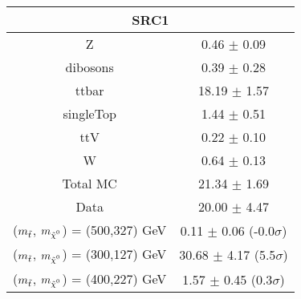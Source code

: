 \begin{tabular}{c|c}
\hline\hline
\multicolumn{2}{c}{\bf SRC1 } \\ \hline 
Z & 0.46 $\pm$ 0.09 \\
dibosons & 0.39 $\pm$ 0.28 \\
ttbar & 18.19 $\pm$ 1.57 \\
singleTop & 1.44 $\pm$ 0.51 \\
ttV & 0.22 $\pm$ 0.10 \\
W & 0.64 $\pm$ 0.13 \\
\hline
Total MC & 21.34 $\pm$ 1.69 \\
Data & 20.00 $\pm$ 4.47 \\
\hline
 ($m_{\tilde{t}}$, $\mLSP$) = (500,327) GeV & 0.11 $\pm$ 0.06 (-0.0$\sigma$) \\
\hline
 ($m_{\tilde{t}}$, $\mLSP$) = (300,127) GeV & 30.68 $\pm$ 4.17 (5.5$\sigma$) \\
\hline
 ($m_{\tilde{t}}$, $\mLSP$) = (400,227) GeV & 1.57 $\pm$ 0.45 (0.3$\sigma$) \\
\hline\hline
\end{tabular}
